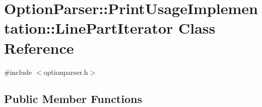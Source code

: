 \hypertarget{class_option_parser_1_1_print_usage_implementation_1_1_line_part_iterator}{\section{Option\-Parser\-:\-:Print\-Usage\-Implementation\-:\-:Line\-Part\-Iterator Class Reference}
\label{class_option_parser_1_1_print_usage_implementation_1_1_line_part_iterator}
}


{\ttfamily \#include $<$optionparser.\-h$>$}

\subsection*{Public Member Functions}
